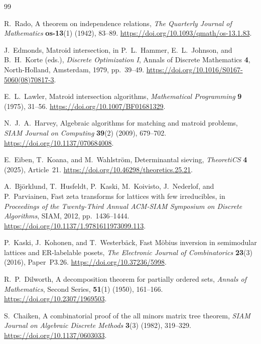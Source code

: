 \begin{thebibliography}{99}
\raggedright

R.~Rado, A theorem on independence relations,
\emph{The Quarterly Journal of Mathematics} \textbf{os-13}(1) (1942),
83--89. \url{https://doi.org/10.1093/qmath/os-13.1.83}.

J.~Edmonds, Matroid intersection, in P.~L.~Hammer, E.~L.~Johnson,
and B.~H.~Korte (eds.), \emph{Discrete Optimization I},
Annals of Discrete Mathematics \textbf{4}, North-Holland, Amsterdam,
1979, pp.~39--49. \url{https://doi.org/10.1016/S0167-5060(08)70817-3}.

E.~L.~Lawler, Matroid intersection algorithms,
\emph{Mathematical Programming} \textbf{9} (1975), 31--56.
\url{https://doi.org/10.1007/BF01681329}.

N.~J.~A.~Harvey, Algebraic algorithms for matching and matroid problems,
\emph{SIAM Journal on Computing} \textbf{39}(2) (2009), 679--702.
\url{https://doi.org/10.1137/070684008}.

E.~Eiben, T.~Koana, and M.~Wahlstr\"om, Determinantal sieving,
\emph{TheoretiCS} \textbf{4} (2025), Article~21.
\url{https://doi.org/10.46298/theoretics.25.21}.

A.~Bj\"orklund, T.~Husfeldt, P.~Kaski, M.~Koivisto, J.~Nederlof,
and P.~Parviainen, Fast zeta transforms for lattices with few irreducibles,
in \emph{Proceedings of the Twenty-Third Annual ACM-SIAM Symposium
on Discrete Algorithms}, SIAM, 2012, pp.~1436--1444.
\url{https://doi.org/10.1137/1.9781611973099.113}.

P.~Kaski, J.~Kohonen, and T.~Westerb\"ack, Fast M\"obius inversion
in semimodular lattices and ER-labelable posets,
\emph{The Electronic Journal of Combinatorics} \textbf{23}(3) (2016),
Paper~P3.26. \url{https://doi.org/10.37236/5998}.

R.~P.~Dilworth, A decomposition theorem for partially ordered sets,
\emph{Annals of Mathematics}, Second Series, \textbf{51}(1) (1950),
161--166. \url{https://doi.org/10.2307/1969503}.

S.~Chaiken, A combinatorial proof of the all minors matrix tree theorem,
\emph{SIAM Journal on Algebraic Discrete Methods} \textbf{3}(3) (1982),
319--329. \url{https://doi.org/10.1137/0603033}.


\end{thebibliography}
